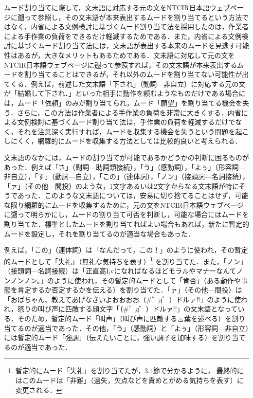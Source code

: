 \documentclass[japanese]{jnlp_1.4}
\begin{document}
ムード割り当てに際して，文末語に対応する元の文をNTCIR日本語ウェブページに遡って参照し，その文末語が本来表出するムードを割り当てるという方法ではなく，内省による文例検討に基づくムード割り当て法を採用したのは，作業者による手作業の負荷をできるだけ軽減するためである．また，内省による文例検討に基づくムード割り当て法には，文末語が表出する本来のムードを見逃す可能性はあるが，大きなメリットもあるためである．文末語に対応して元の文をNTCIR日本語ウェブページに遡って参照すれば，その文末語が本来表出するムードを割り当てることはできるが，それ以外のムードを割り当てない可能性が出てくる．例えば，前述した文末語「下され」（動詞—非自立）に対応する元の文が「結婚して下され．」といった相手に動作を頼むようなものだけである場合には，ムード「依頼」のみが割り当てられ，ムード「願望」を割り当てる機会を失う．さらに，この方法は作業者による手作業の負荷を非常に大きくする．内省による文例検討に基づくムード割り当て法は，手作業の負荷を軽減するだけでなく，それを注意深く実行すれば，ムードを収集する機会を失うという問題を起こしにくく，網羅的にムードを収集する方法としては比較的良いと考えられる．

文末語のなかには，ムードの割り当てが可能であるかどうかの判断に困るものがあった．例えば「さ」（副詞—助詞類接続），「う」（感動詞），「よぅ」（形容詞—非自立），「す」（動詞—自立），「この」（連体詞），「ノン」（接頭詞—名詞接続），「ァ」（その他—間投）のような，1文字あるいは2文字からなる文末語が特にそうであった．このような文末語については，安易に切り捨てることはせず，可能な限り網羅的にムードを収集するために，元の文をNTCIR日本語ウェブページに遡って明らかにし，ムードの割り当て可否を判断し，可能な場合にはムードを割り当てた．標準としたムードを割り当てればよい場合もあれば，新たに暫定的ムードを設定し，それを割り当てるのが適当な場合もあった．

例えば，「この」（連体詞）は「なんだって，この！」のように使われ，その暫定的ムードとして「失礼」（無礼な気持ちを表す）\footnote{
	暫定的にムード「失礼」を割り当てたが，3.4節で分かるように，
	最終的にはこのムードは「非難」（過失，欠点などを責めとがめる気持ちを表す）に変更される．}
を割り当てた．また，「ノン」（接頭詞—名詞接続）は「正直高Lvになればなるほどモラルやマナーなんてノンノンノン。」のように使われ，その暫定的ムードとして「肯否」（ある動作や事態を肯定するか否定するかを伝える）を割り当てた．「ァ」（その他—間投）は「おばちゃん、教えてあげなさいよおおおお（{\#}゜д゜）ドルァ!!」のように使われ，怒りの叫び声に匹敵する顔文字「（{\#}゜д゜）ドルァ!!」の文末語となっている．そのため，暫定的ムード「叫声」（叫び声に匹敵する言葉を述べる）を割り当てるのが適当であった．その他，「う」（感動詞）と「よぅ」（形容詞—非自立）には暫定的ムード「強調」（伝えたいことに，強い調子を加味する）を割り当てるのが適当であった．
\end{document}
